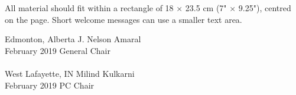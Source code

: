 \documentclass[12pt,letterpaper]{article}
\begin{document}
All material should fit within a rectangle of 18 × 23.5 cm (7" × 9.25"), centred on the page. Short welcome messages can use a smaller text area.
%
%
%
%
%
%
%

\bigskip
\noindent
Edmonton, Alberta       \hfill J. Nelson Amaral\\
February 2019 \hfill General Chair
\\
~\\
West Lafayette, IN       \hfill Milind Kulkarni\\
February 2019 \hfill PC Chair
\end{document}

